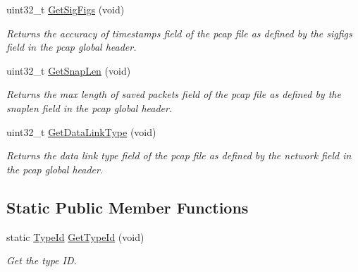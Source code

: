\begin{DoxyCompactItemize}
uint32\+\_\+t \hyperlink{classns3_1_1PcapFileWrapper_a7d3709b3e1a3d198ae66d8fabefab73a}{Get\+Sig\+Figs} (void)
\begin{DoxyCompactList}\small\item\em Returns the accuracy of timestamps field of the pcap file as defined by the sigfigs field in the pcap global header. \end{DoxyCompactList}\item 
uint32\+\_\+t \hyperlink{classns3_1_1PcapFileWrapper_a3589e30c015e8a215ccc02a3cfbdee81}{Get\+Snap\+Len} (void)
\begin{DoxyCompactList}\small\item\em Returns the max length of saved packets field of the pcap file as defined by the snaplen field in the pcap global header. \end{DoxyCompactList}\item 
uint32\+\_\+t \hyperlink{classns3_1_1PcapFileWrapper_a1ea3ae0fe160429a34d23f40d70e2e61}{Get\+Data\+Link\+Type} (void)
\begin{DoxyCompactList}\small\item\em Returns the data link type field of the pcap file as defined by the network field in the pcap global header. \end{DoxyCompactList}\end{DoxyCompactItemize}
\subsection*{Static Public Member Functions}
\begin{DoxyCompactItemize}
\item 
static \hyperlink{classns3_1_1TypeId}{Type\+Id} \hyperlink{classns3_1_1PcapFileWrapper_a8c21964d5910e1a29c414e9f7188e22d}{Get\+Type\+Id} (void)
\begin{DoxyCompactList}\small\item\em Get the type ID. \end{DoxyCompactList}\end{DoxyCompactItemize}
